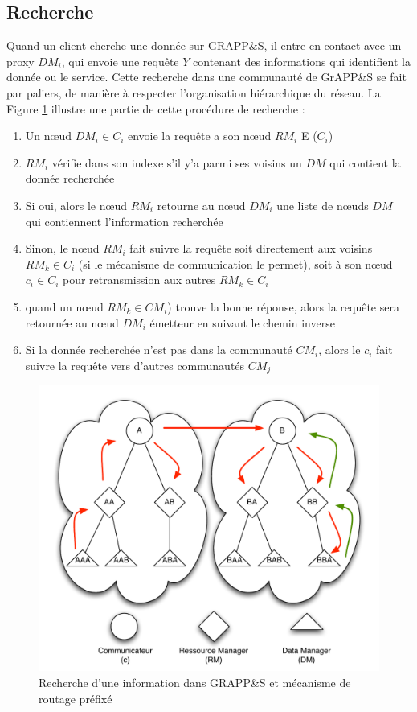 \subsection{Recherche}
Quand un client cherche une donnée sur GRAPP\&S, il entre en contact avec un proxy $DM_i$, qui envoie une requête $Y$ contenant des informations qui identifient la donnée ou le service. Cette recherche dans une communauté de GrAPP\&S se fait par paliers, de manière à respecter l'organisation hiérarchique du réseau. La Figure \ref{fig:routage} illustre une partie de cette procédure de recherche : 
\begin{enumerate}
	\item Un n{\oe}ud $DM_i \in C_i$ envoie la requête a son n{\oe}ud $RM_i$ E ($C_i$)
	\item $RM_i$ vérifie dans son indexe s'il y'a parmi ses voisins un $DM$ qui contient la donnée recherchée
	\item Si oui, alors le n{\oe}ud $RM_i$ retourne au n{\oe}ud $DM_i$  une liste de n{\oe}uds $DM$ qui contiennent l'information recherchée
	\item Sinon, le n{\oe}ud $RM_i$ fait suivre la requête soit directement aux voisins $RM_k \in C_i$ (si le mécanisme de communication le permet), soit à son n{\oe}ud $c_i \in C_i$ pour retransmission aux autres $RM_k \in C_i$
	\item quand un  n{\oe}ud $RM_k \in CM_i$) trouve la bonne réponse, alors la requête sera retournée au n{\oe}ud $DM_i$ émetteur en suivant le chemin inverse 
	\item Si la donnée recherchée n'est pas dans la communauté $CM_i$, alors le $c_i$ fait suivre la requête vers d'autres communautés $CM_j$     
\end{enumerate}

\begin{figure}
	\includegraphics[width=1\linewidth]{img/Routage1.pdf} 
	\caption{Recherche d'une information dans GRAPP\&S et mécanisme de routage préfixé\label{fig:routage}}
\end{figure}

